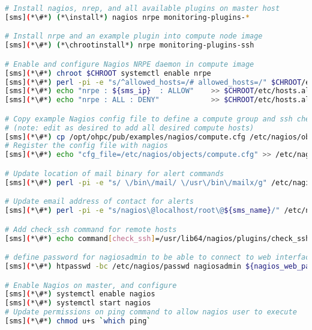 \begin{lstlisting}[language=bash,keywords={},upquote=true]
# Install nagios, nrep, and all available plugins on master host
[sms](*\#*) (*\install*) nagios nrpe monitoring-plugins-*

# Install nrpe and an example plugin into compute node image
[sms](*\#*) (*\chrootinstall*) nrpe monitoring-plugins-ssh

# Enable and configure Nagios NRPE daemon in compute image
[sms](*\#*) chroot $CHROOT systemctl enable nrpe
[sms](*\#*) perl -pi -e "s/^allowed_hosts=/# allowed_hosts=/" $CHROOT/etc/nagios/nrpe.cfg
[sms](*\#*) echo "nrpe : ${sms_ip}  : ALLOW"    >> $CHROOT/etc/hosts.allow
[sms](*\#*) echo "nrpe : ALL : DENY"            >> $CHROOT/etc/hosts.allow

# Copy example Nagios config file to define a compute group and ssh check
# (note: edit as desired to add all desired compute hosts)
[sms](*\#*) cp /opt/ohpc/pub/examples/nagios/compute.cfg /etc/nagios/objects
# Register the config file with nagios
[sms](*\#*) echo "cfg_file=/etc/nagios/objects/compute.cfg" >> /etc/nagios/nagios.cfg

# Update location of mail binary for alert commands
[sms](*\#*) perl -pi -e "s/ \/bin\/mail/ \/usr\/bin\/mailx/g" /etc/nagios/objects/commands.cfg

# Update email address of contact for alerts
[sms](*\#*) perl -pi -e "s/nagios\@localhost/root\@${sms_name}/" /etc/nagios/objects/contacts.cfg

# Add check_ssh command for remote hosts
[sms](*\#*) echo command[check_ssh]=/usr/lib64/nagios/plugins/check_ssh localhost $CHROOT/etc/nagios/nrpe.cfg

# define password for nagiosadmin to be able to connect to web interface
[sms](*\#*) htpasswd -bc /etc/nagios/passwd nagiosadmin ${nagios_web_password}

# Enable Nagios on master, and configure
[sms](*\#*) systemctl enable nagios
[sms](*\#*) systemctl start nagios
# Update permissions on ping command to allow nagios user to execute
[sms](*\#*) chmod u+s `which ping`
\end{lstlisting}

